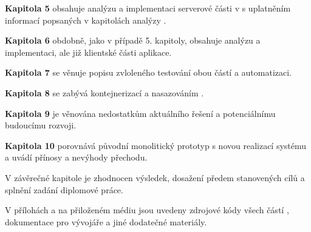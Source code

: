 \textbf{Kapitola 5} obsahuje analýzu a implementaci serverové části  v  s uplatněním informací popsaných v kapitolách analýzy .

\textbf{Kapitola 6} obdobně, jako v případě 5.
kapitoly, obsahuje analýzu a implementaci, ale již klientské části aplikace.

\textbf{Kapitola 7} se věnuje popisu zvloleného testování obou částí  a automatizaci.

\textbf{Kapitola 8} se zabývá kontejnerizací a nasazováním .

\textbf{Kapitola 9} je věnována nedostatkům aktuálního řešení a potenciálnímu budoucímu rozvoji.

\textbf{Kapitola 10} porovnává původní monolitický prototyp s novou realizací systému a uvádí přínosy a nevýhody přechodu.

V závěrečné kapitole je zhodnocen výsledek, dosažení předem stanovených cílů a splnění zadání diplomové práce.

V přílohách a na přiloženém médiu jsou uvedeny zdrojové kódy všech částí , dokumentace pro vývojáře a jiné dodatečné materiály.

